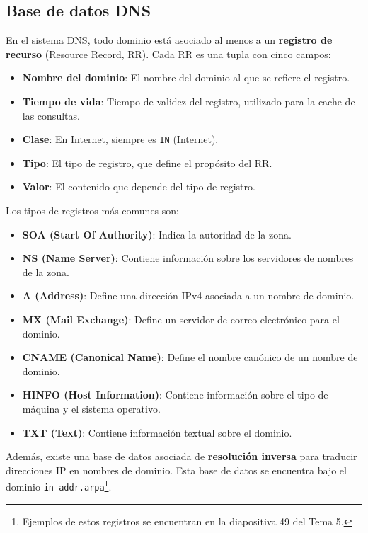 \documentclass[a4paper,12pt]{article}
\begin{document}
\subsection{Base de datos DNS}

En el sistema DNS, todo dominio está asociado al menos a un \textbf{registro de recurso} (Resource Record, RR). Cada RR es una tupla con cinco campos:

\begin{itemize}
    \item \textbf{Nombre del dominio}: El nombre del dominio al que se refiere el registro.
    \item \textbf{Tiempo de vida}: Tiempo de validez del registro, utilizado para la cache de las consultas.
    \item \textbf{Clase}: En Internet, siempre es \texttt{IN} (Internet).
    \item \textbf{Tipo}: El tipo de registro, que define el propósito del RR.
    \item \textbf{Valor}: El contenido que depende del tipo de registro.
\end{itemize}

Los tipos de registros más comunes son:

\begin{itemize}
    \item \textbf{SOA (Start Of Authority)}: Indica la autoridad de la zona.
    \item \textbf{NS (Name Server)}: Contiene información sobre los servidores de nombres de la zona.
    \item \textbf{A (Address)}: Define una dirección IPv4 asociada a un nombre de dominio.
    \item \textbf{MX (Mail Exchange)}: Define un servidor de correo electrónico para el dominio.
    \item \textbf{CNAME (Canonical Name)}: Define el nombre canónico de un nombre de dominio.
    \item \textbf{HINFO (Host Information)}: Contiene información sobre el tipo de máquina y el sistema operativo.
    \item \textbf{TXT (Text)}: Contiene información textual sobre el dominio.
\end{itemize}

Además, existe una base de datos asociada de \textbf{resolución inversa} para traducir direcciones IP en nombres de dominio. Esta base de datos se encuentra bajo el dominio \texttt{in-addr.arpa}\footnote{Ejemplos de estos registros se encuentran en la diapositiva 49 del Tema 5.}.
\end{document}
